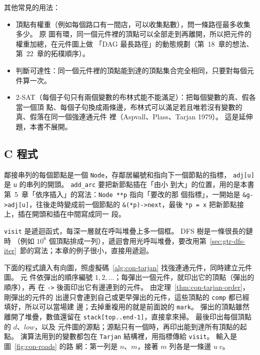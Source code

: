 其他常見的用法：

\begin{itemize}
\item 頂點有權重（例如每個路口有一間店，可以收集點數），問一條路徑最多收集多少。 原
圖有環，同一個元件裡的頂點可以全部走到再離開，所以把元件的權重加總，在元件圖上做
「DAG 最長路徑」的動態規劃（第~18~章的想法、第~22~章的拓樸順序）。
\item 判斷可達性：同一個元件裡的頂點能到達的頂點集合完全相同，只要對每個元件算一次。
\item 2-SAT（每個子句只有兩個變數的布林式能不能滿足）：把每個變數的真、假各當一個頂
點、每個子句換成兩條邊，布林式可以滿足若且唯若沒有變數的真、假落在同一個強連通元件
裡（Aspvall、Plass、Tarjan 1979）。 這是延伸題，本書不展開。
\end{itemize}

\subsection{C 程式}

\begin{cbookrecap}
鄰接串列的每個節點是一個 \texttt{Node}，存鄰居編號和指向下一個節點的指標，
\texttt{adj[u]} 是 \texttt{u} 的串列的開頭。 \texttt{add\_arc} 要把新節點插在「由小
到大」的位置，用的是本書第~5~章「依序插入」的寫法：\texttt{Node **p} 指向「要改的那
個指標」，一開始是 \texttt{\&g->adj[u]}，往後走時變成前一個節點的
\texttt{\&(*p)->next}，最後 \texttt{*p = x} 把新節點接上，插在開頭和插在中間寫成同一
段。

\texttt{visit} 是遞迴函式，每深一層就在呼叫堆疊上多一個框。 DFS 樹是一條很長的鏈時
（例如 $10^6$ 個頂點排成一列），遞迴會用光呼叫堆疊，要改用第~\ref{sec:gtr-dfs-iter}~節的寫法；本章的例子很小，直接用遞迴。
\end{cbookrecap}

下面的程式讀入有向圖，照虛擬碼~\ref{alg:con-tarjan} 找強連通元件，同時建立元件圖。 元
件依彈出的順序編號 $1, 2, \ldots$；每彈出一個元件，就印出它的頂點（彈出的順序），再
在 \texttt{->} 後面印出它有邊連到的元件。 由定理~\ref{thm:con-tarjan-order}，剛彈出的元件的
出邊只會連到自己或更早彈出的元件，這些頂點的 \texttt{comp} 都已經填好，所以可以當場建
邊；去掉重複用的就是前面說的 \texttt{mark}。 彈出的頂點雖然離開了堆疊，數值還留在
\texttt{stack[top..end-1]}，直接拿來掃。 最後印出每個頂點的 $d$、$\mathit{low}$，以及
元件圖的源點；源點只有一個時，再印出能到達所有頂點的起點。 演算法用到的變數都包在
\texttt{Tarjan} 結構裡，用指標傳給 \texttt{visit}。 輸入是圖~\ref{fig:con-roads} 的路
網：第一列是 $n$、$m$，接著 $m$ 列各是一條邊 $u\ v$。


